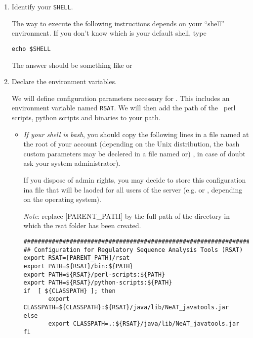 \begin{enumerate}

\item Identify your \texttt{SHELL}.

  The way to execute the following instructions depends on your
  ``shell'' environment. If you don't know which is your default
  shell, type

\lstset{language=csh}

\begin{lstlisting}
echo $SHELL
\end{lstlisting}

The answer should be something like  or

\item Declare the \RSAT environment variables.

  We will define configuration parameters necessary for \RSAT.  This
  includes an environment variable named \texttt{RSAT}.  We will then
  add the path of the \RSAT \ perl scripts, python scripts and
  binaries to your path.

\begin{itemize}

\item \emph{If your shell is bash}, you should copy the following
  lines in a file named  at the root of your
  account (depending on the Unix distribution, the bash custom
  parameters may be declered in a file named  or)
  , in case of doubt ask your system administrator).

  If you dispose of admin rights, you may decide to store this
  configuration ina file that will be laoded for all users of the
  server (e.g.  or ,
  depending on the operating system).

  \emph{Note}: replace [PARENT\_PATH] by the full path of the directory
  in which the rsat folder has been created.

\begin{lstlisting}
################################################################
## Configuration for Regulatory Sequence Analysis Tools (RSAT)
export RSAT=[PARENT_PATH]/rsat
export PATH=${RSAT}/bin:${PATH}
export PATH=${RSAT}/perl-scripts:${PATH}
export PATH=${RSAT}/python-scripts:${PATH}
if  [ ${CLASSPATH} ]; then
       export CLASSPATH=${CLASSPATH}:${RSAT}/java/lib/NeAT_javatools.jar
else
       export CLASSPATH=.:${RSAT}/java/lib/NeAT_javatools.jar
fi


\end{lstlisting}
\end{itemize}
\end{enumerate}
